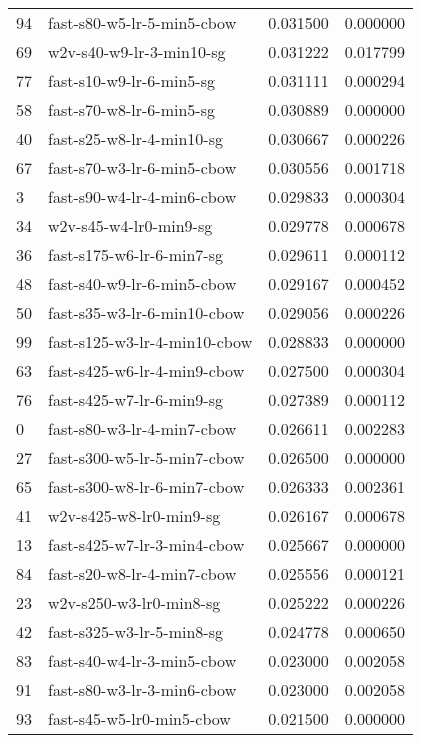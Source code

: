 {\begin{tabular}{llrr}
94 &    fast-s80-w5-lr-5-min5-cbow &  0.031500 &  0.000000 \\
69 &      w2v-s40-w9-lr-3-min10-sg &  0.031222 &  0.017799 \\
77 &      fast-s10-w9-lr-6-min5-sg &  0.031111 &  0.000294 \\
58 &      fast-s70-w8-lr-6-min5-sg &  0.030889 &  0.000000 \\
40 &     fast-s25-w8-lr-4-min10-sg &  0.030667 &  0.000226 \\
67 &    fast-s70-w3-lr-6-min5-cbow &  0.030556 &  0.001718 \\
3  &    fast-s90-w4-lr-4-min6-cbow &  0.029833 &  0.000304 \\
34 &        w2v-s45-w4-lr0-min9-sg &  0.029778 &  0.000678 \\
36 &     fast-s175-w6-lr-6-min7-sg &  0.029611 &  0.000112 \\
48 &    fast-s40-w9-lr-6-min5-cbow &  0.029167 &  0.000452 \\
50 &   fast-s35-w3-lr-6-min10-cbow &  0.029056 &  0.000226 \\
99 &  fast-s125-w3-lr-4-min10-cbow &  0.028833 &  0.000000 \\
63 &   fast-s425-w6-lr-4-min9-cbow &  0.027500 &  0.000304 \\
76 &     fast-s425-w7-lr-6-min9-sg &  0.027389 &  0.000112 \\
0  &    fast-s80-w3-lr-4-min7-cbow &  0.026611 &  0.002283 \\
27 &   fast-s300-w5-lr-5-min7-cbow &  0.026500 &  0.000000 \\
65 &   fast-s300-w8-lr-6-min7-cbow &  0.026333 &  0.002361 \\
41 &       w2v-s425-w8-lr0-min9-sg &  0.026167 &  0.000678 \\
13 &   fast-s425-w7-lr-3-min4-cbow &  0.025667 &  0.000000 \\
84 &    fast-s20-w8-lr-4-min7-cbow &  0.025556 &  0.000121 \\
23 &       w2v-s250-w3-lr0-min8-sg &  0.025222 &  0.000226 \\
42 &     fast-s325-w3-lr-5-min8-sg &  0.024778 &  0.000650 \\
83 &    fast-s40-w4-lr-3-min5-cbow &  0.023000 &  0.002058 \\
91 &    fast-s80-w3-lr-3-min6-cbow &  0.023000 &  0.002058 \\
93 &     fast-s45-w5-lr0-min5-cbow &  0.021500 &  0.000000 \\
\bottomrule
\end{tabular}
}
